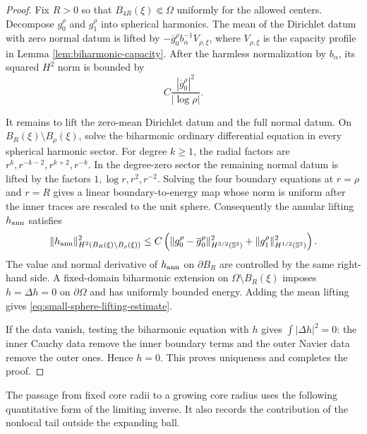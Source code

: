 \documentclass[11pt]{article}
\numberwithin{equation}{section}
\begin{document}
\begin{proof}
Fix $R>0$ so that $B_{4R}(\xi)\Subset\Omega$ uniformly for the
allowed centers. Decompose $g_0^\rho$ and $g_1^\rho$ into spherical
harmonics. The mean of the Dirichlet datum with zero normal datum is
lifted by $-\overline g_0^\rho b_\alpha^{-1}V_{\rho,\xi}$, where
$V_{\rho,\xi}$ is the capacity profile in Lemma
\ref{lem:biharmonic-capacity}. After the harmless normalization by
$b_\alpha$, its squared $H^2$ norm is bounded by
\[
C\frac{|\overline g_0^\rho|^2}{|\log\rho|}.
\]

It remains to lift the zero-mean Dirichlet datum and the full normal
datum. On $B_R(\xi)\setminus B_\rho(\xi)$, solve the biharmonic
ordinary differential equation in every spherical harmonic sector.
For degree $k\geq1$, the radial factors are
$r^k,r^{-k-2},r^{k+2},r^{-k}$. In the degree-zero sector the remaining
normal datum is lifted by the factors $1,\log r,r^2,r^{-2}$. Solving
the four boundary equations at $r=\rho$ and $r=R$ gives a linear
boundary-to-energy map whose norm is uniform after the inner traces
are rescaled to the unit sphere. Consequently the annular lifting
$h_{\rm ann}$ satisfies
\[
\|h_{\rm ann}\|_{H^2(B_R(\xi)\setminus B_\rho(\xi))}^2
\leq C\left(
\|g_0^\rho-\overline g_0^\rho\|_{H^{3/2}(\mathbb S^3)}^2
+\|g_1^\rho\|_{H^{1/2}(\mathbb S^3)}^2\right).
\]
The value and normal derivative of $h_{\rm ann}$ on $\partial B_R$
are controlled by the same right-hand side. A fixed-domain
biharmonic extension on $\Omega\setminus B_R(\xi)$ imposes
$h=\Delta h=0$ on $\partial\Omega$ and has uniformly bounded energy.
Adding the mean lifting gives
\eqref{eq:small-sphere-lifting-estimate}.

If the data vanish, testing the biharmonic equation with $h$ gives
$\int|\Delta h|^2=0$: the inner Cauchy data remove the inner boundary
terms and the outer Navier data remove the outer ones. Hence $h=0$.
This proves uniqueness and completes the proof.
\end{proof}

The passage from fixed core radii to a growing core radius uses the
following quantitative form of the limiting inverse. It also records
the contribution of the nonlocal tail outside the expanding ball.
\end{document}

